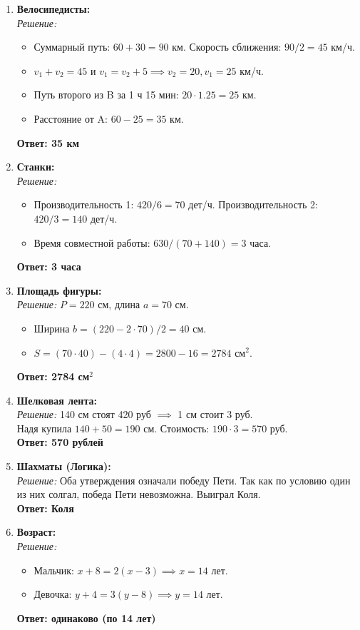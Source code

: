 \begin{enumerate}
    \item \textbf{Велосипедисты:} \\
    \textit{Решение:}
    \begin{itemize}
        \item Суммарный путь: $60 + 30 = 90$ км. Скорость сближения: $90 / 2 = 45$ км/ч.
        \item $v_1 + v_2 = 45$ и $v_1 = v_2 + 5 \implies v_2 = 20, v_1 = 25$ км/ч.
        \item Путь второго из B за 1 ч 15 мин: $20 \cdot 1.25 = 25$ км.
        \item Расстояние от A: $60 - 25 = 35$ км.
    \end{itemize}
    \textbf{Ответ: 35 км}

    \item \textbf{Станки:} \\
    \textit{Решение:}
    \begin{itemize}
        \item Производительность 1: $420 / 6 = 70$ дет/ч. Производительность 2: $420 / 3 = 140$ дет/ч.
        \item Время совместной работы: $630 / (70 + 140) = 3$ часа.
    \end{itemize}
    \textbf{Ответ: 3 часа}

    \item \textbf{Площадь фигуры:} \\
    \textit{Решение:} $P = 220$ см, длина $a = 70$ см.
    \begin{itemize}
        \item Ширина $b = (220 - 2 \cdot 70) / 2 = 40$ см.
        \item $S = (70 \cdot 40) - (4 \cdot 4) = 2800 - 16 = 2784 \text{ см}^2$.
    \end{itemize}
    \textbf{Ответ: 2784 см$^2$}

    \item \textbf{Шелковая лента:} \\
    \textit{Решение:} 140 см стоят 420 руб $\implies$ 1 см стоит 3 руб. \\
    Надя купила $140 + 50 = 190$ см. Стоимость: $190 \cdot 3 = 570$ руб. \\
    \textbf{Ответ: 570 рублей}

    \item \textbf{Шахматы (Логика):} \\
    \textit{Решение:} Оба утверждения означали победу Пети. Так как по условию один из них солгал, победа Пети невозможна. Выиграл Коля. \\
    \textbf{Ответ: Коля}

    \item \textbf{Возраст:} \\
    \textit{Решение:}
    \begin{itemize}
        \item Мальчик: $x + 8 = 2(x - 3) \implies x = 14$ лет.
        \item Девочка: $y + 4 = 3(y - 8) \implies y = 14$ лет.
    \end{itemize}
    \textbf{Ответ: одинаково (по 14 лет)}
\end{enumerate}